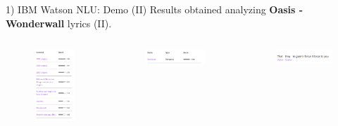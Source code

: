 \documentclass[xcolor=dvipsnames]{beamer}
\begin{document}
\begin{frame}{1) IBM Watson NLU: Demo (II)}
Results obtained analyzing \textbf{Oasis - Wonderwall} lyrics (II).
\begin{columns}
\begin{figure}
	\includegraphics[scale=0.3]{./images/concept}
\end{figure}
\begin{figure}
	\includegraphics[scale=0.3]{./images/entities}
\end{figure}
\begin{figure}
	\includegraphics[scale=0.3]{./images/roles}
\end{figure}
\end{columns}
\end{frame}
\end{document}
